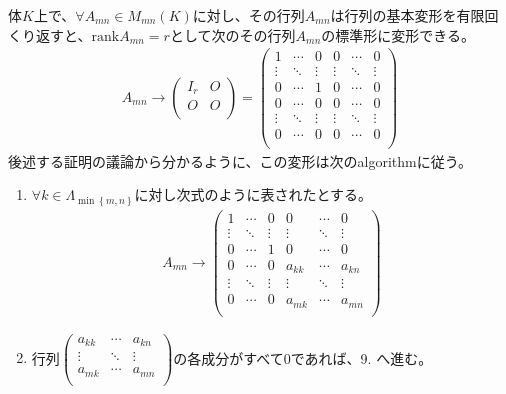 \documentclass[dvipdfmx]{jsarticle}
\begin{document}
\begin{thm}\label{2.1.7.4}
体$K$上で、$\forall A_{mn} \in M_{mn}(K)$に対し、その行列$A_{mn}$は行列の基本変形を有限回くり返すと、${\mathrm{rank}}A_{mn} = r$として次のその行列$A_{mn}$の標準形に変形できる。
\begin{align*}
A_{mn} \rightarrow \begin{pmatrix}
I_{r} & O \\
O & O \\
\end{pmatrix} = \begin{pmatrix}
1 & \cdots & 0 & 0 & \cdots & 0 \\
 \vdots & \ddots & \vdots & \vdots & \ddots & \vdots \\
0 & \cdots & 1 & 0 & \cdots & 0 \\
0 & \cdots & 0 & 0 & \cdots & 0 \\
 \vdots & \ddots & \vdots & \vdots & \ddots & \vdots \\
0 & \cdots & 0 & 0 & \cdots & 0 \\
\end{pmatrix}
\end{align*}
後述する証明の議論から分かるように、この変形は次のalgorithmに従う。
\begin{enumerate}
\item
  $\forall k \in \varLambda_{\min\left\{ m,n \right\}}$に対し次式のように表されたとする。
\begin{align*}
A_{mn} \rightarrow \begin{pmatrix}
1 & \cdots & 0 & 0 & \cdots & 0 \\
 \vdots & \ddots & \vdots & \vdots & \ddots & \vdots \\
0 & \cdots & 1 & 0 & \cdots & 0 \\
0 & \cdots & 0 & a_{kk} & \cdots & a_{kn} \\
 \vdots & \ddots & \vdots & \vdots & \ddots & \vdots \\
0 & \cdots & 0 & a_{mk} & \cdots & a_{mn} \\
\end{pmatrix}
\end{align*}
\item
  行列$\begin{pmatrix}
  a_{kk} & \cdots & a_{kn} \\
   \vdots & \ddots & \vdots \\
  a_{mk} & \cdots & a_{mn} \\
  \end{pmatrix}$の各成分がすべて0であれば、9. へ進む。

\end{enumerate}
\end{thm}
\end{document}
